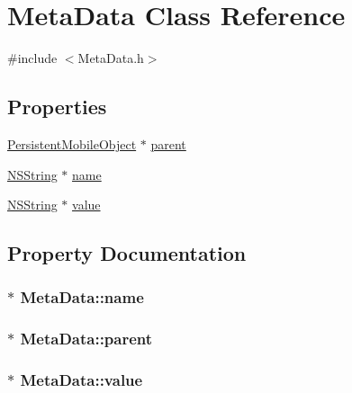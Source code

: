 \hypertarget{interface_meta_data}{
\section{\-Meta\-Data \-Class \-Reference}
\label{interface_meta_data}
}


{\ttfamily \#include $<$\-Meta\-Data.\-h$>$}

\subsection*{\-Properties}
\begin{DoxyCompactItemize}
\item 
\hyperlink{interface_persistent_mobile_object}{\-Persistent\-Mobile\-Object} $\ast$ \hyperlink{interface_meta_data_af9fff4909bf569709b8f977f872c35a5}{parent}
\item 
\hyperlink{class_n_s_string}{\-N\-S\-String} $\ast$ \hyperlink{interface_meta_data_a1da5da5410f684d02e91908854dde687}{name}
\item 
\hyperlink{class_n_s_string}{\-N\-S\-String} $\ast$ \hyperlink{interface_meta_data_a03f755db1a03c856373ec60b50fbc2e2}{value}
\end{DoxyCompactItemize}


\subsection{\-Property \-Documentation}
\hypertarget{interface_meta_data_a1da5da5410f684d02e91908854dde687}{
\subsubsection[{name}]{$\ast$ \-Meta\-Data\-::name}}
\label{interface_meta_data_a1da5da5410f684d02e91908854dde687}
\hypertarget{interface_meta_data_af9fff4909bf569709b8f977f872c35a5}{
\subsubsection[{parent}]{$\ast$ \-Meta\-Data\-::parent}}
\label{interface_meta_data_af9fff4909bf569709b8f977f872c35a5}
\hypertarget{interface_meta_data_a03f755db1a03c856373ec60b50fbc2e2}{
\subsubsection[{value}]{$\ast$ \-Meta\-Data\-::value}}
\label{interface_meta_data_a03f755db1a03c856373ec60b50fbc2e2}


